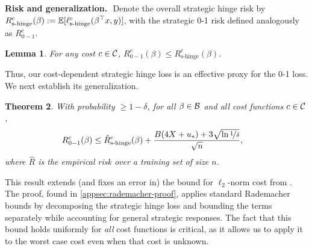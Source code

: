 \documentclass{article}
\newcommand{\costset}{\gC}
\newcommand{\costfunc}{c}
\newcommand{\shingeloss}{\ell_{\textrm{s-hinge}}}
\newcommand{\shingepoprisk}{R_{\textrm{s-hinge}}}
\newcommand{\uinv}{\ensuremath{u_{*}}}
\newcommand{\dualnorm}[1]{\|#1\|_{*}}
\newcommand{\cinc}{{\costfunc\in\costset}}
\newtheorem{theorem}{Theorem}[section]
\newtheorem{lemma}[theorem]{Lemma}
\theoremstyle{definition}
\newtheorem{definition}[theorem]{Definition}
\renewcommand{\paragraph}[1]{{\textbf{#1}\,\,}}
\begin{document}

\paragraph{Risk and generalization.}
Denote the overall strategic hinge risk by $\shingepoprisk^c(\beta) := \E[\shingeloss^c(\beta^\top x, y)]$, with the strategic 0-1 risk defined analogously as $R_{0-1}^{\costfunc}$.
\begin{lemma}
    \label{cor-zo-shinge}
    For any cost $c\in\costset$, $R_{0-1}^{\costfunc}(\beta) \leq \shingepoprisk^c(\beta)$.
\end{lemma}
Thus, our cost-dependent strategic hinge loss is an effective proxy for the 0-1 loss.
We next establish its generalization.
\begin{theorem} %
\label{thm:generalization-main-body}
With probability $\geq 1-\delta$, for all $\beta \in{\mathcal{B}}$ and all cost functions $\cinc$,
\begin{align*}
    R_{0-1}^{\costfunc}(\beta) &\leq \hat R_{\textrm{s-hinge}}^c(\beta) + \frac{B(4X + \uinv) + 3\sqrt{\ln \nicefrac{1}{\delta}}}{\sqrt{n}},
\end{align*}
where $\hat R$ is the empirical risk over a training set of size $n$.
\end{theorem}
This result extends (and fixes an error in) the bound for $\ell_2$-norm cost from \citet{levanon2022generalized}. The proof, found in \cref{appsec:rademacher-proof}, applies standard Rademacher bounds by decomposing the strategic hinge loss and bounding the terms separately while accounting for general strategic responses. The fact that this bound holds uniformly for \emph{all} cost functions is critical, as it allows us to apply it to the worst case cost even when that cost is unknown.
\end{document}
